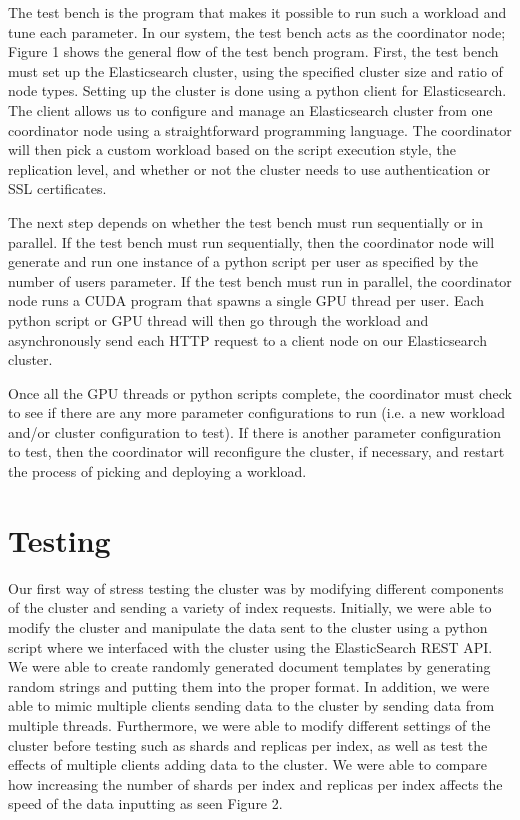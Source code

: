 \documentclass[journal]{IEEEtran}
\begin{document}
The test bench is the program that makes it possible to run such a workload and tune each parameter. In our system, the test bench acts as the coordinator node; Figure 1 shows the general flow of the test bench program. First, the test bench must set up the Elasticsearch cluster, using the specified cluster size and ratio of node types. Setting up the cluster is done using a python client for Elasticsearch. The client allows us to configure and manage an Elasticsearch cluster from one coordinator node using a straightforward programming language. The coordinator will then pick a custom workload based on the script execution style, the replication level, and whether or not the cluster needs to use authentication or SSL certificates.

The next step depends on whether the test bench must run sequentially or in parallel. If the test bench must run sequentially, then the coordinator node will generate and run one instance of a python script per user as specified by the number of users parameter. If the test bench must run in parallel, the coordinator node runs a CUDA program that spawns a single GPU thread per user. Each python script or GPU thread will then go through the workload and asynchronously send each HTTP request to a client node on our Elasticsearch cluster.

Once all the GPU threads or python scripts complete, the coordinator must check to see if there are any more parameter configurations to run (i.e. a new workload and/or cluster configuration to test). If there is another parameter configuration to test, then the coordinator will reconfigure the cluster, if necessary, and restart the process of picking and deploying a workload.


\section{Testing}

Our first way of stress testing the cluster was by modifying different components of the cluster and sending a variety of index requests.  Initially, we were able to modify the cluster and manipulate the data sent to the cluster using a python script where we interfaced with the cluster using the ElasticSearch REST API. We were able to create randomly generated document templates by generating random strings and putting them into the proper format. In addition, we were able to mimic multiple clients sending data to the cluster by sending data from multiple threads. Furthermore, we were able to modify different settings of the cluster before testing such as shards and replicas per index, as well as test the effects of multiple clients adding data to the cluster. We were able to compare how increasing the number of shards per index and replicas per index affects the speed of the data inputting as seen Figure 2.
\end{document}
